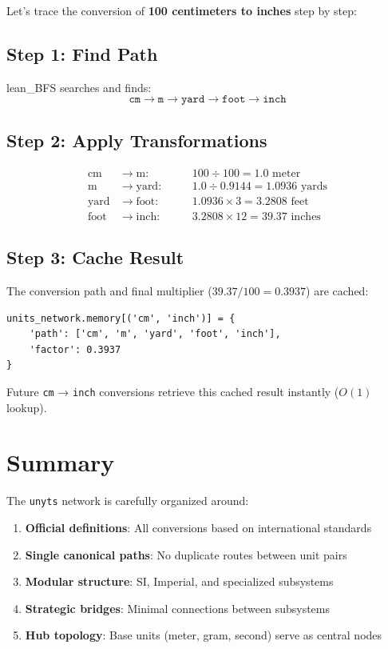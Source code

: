 \documentclass[11pt,a4paper]{report}
\begin{document}
Let's trace the conversion of \textbf{100 centimeters to inches} step by step:

\subsection{Step 1: Find Path}

lean\_BFS searches and finds:
\[
\texttt{cm} \rightarrow \texttt{m} \rightarrow \texttt{yard} \rightarrow \texttt{foot} \rightarrow \texttt{inch}
\]

\subsection{Step 2: Apply Transformations}

\begin{align*}
\text{cm} &\rightarrow \text{m}: \quad && 100 \div 100 = 1.0 \text{ meter} \\
\text{m} &\rightarrow \text{yard}: \quad && 1.0 \div 0.9144 = 1.0936 \text{ yards} \\
\text{yard} &\rightarrow \text{foot}: \quad && 1.0936 \times 3 = 3.2808 \text{ feet} \\
\text{foot} &\rightarrow \text{inch}: \quad && 3.2808 \times 12 = 39.37 \text{ inches}
\end{align*}

\subsection{Step 3: Cache Result}

The conversion path and final multiplier ($39.37 / 100 = 0.3937$) are cached:
\begin{lstlisting}[style=pythonstyle]
units_network.memory[('cm', 'inch')] = {
    'path': ['cm', 'm', 'yard', 'foot', 'inch'],
    'factor': 0.3937
}
\end{lstlisting}

Future \texttt{cm} → \texttt{inch} conversions retrieve this cached result instantly ($O(1)$ lookup).

\section{Summary}

The \texttt{unyts} network is carefully organized around:
\begin{enumerate}[leftmargin=*]
  \item \textbf{Official definitions}: All conversions based on international standards
  \item \textbf{Single canonical paths}: No duplicate routes between unit pairs
  \item \textbf{Modular structure}: SI, Imperial, and specialized subsystems
  \item \textbf{Strategic bridges}: Minimal connections between subsystems
  \item \textbf{Hub topology}: Base units (meter, gram, second) serve as central nodes
\end{enumerate}
\end{document}
